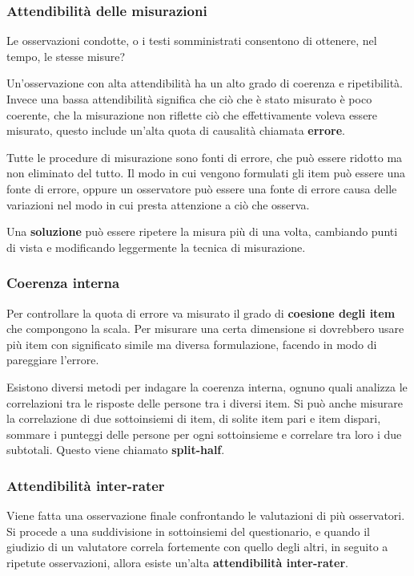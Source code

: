 \documentclass{subfiles}
\begin{document}
    \subsubsection*{Attendibilità delle misurazioni}
        Le osservazioni condotte, o i testi somministrati consentono di ottenere, nel tempo, le stesse 
        misure?

        Un'osservazione con alta attendibilità ha un alto grado di coerenza e ripetibilità. 
        Invece una bassa attendibilità significa che ciò che è stato misurato è poco coerente, che 
        la misurazione non riflette ciò che effettivamente voleva essere misurato, questo include 
        un'alta quota di causalità chiamata \textbf{errore}.

        Tutte le procedure di misurazione sono fonti di errore, che può essere ridotto ma non 
        eliminato del tutto.
        Il modo in cui vengono formulati gli item può essere una fonte di errore, oppure un 
        osservatore può essere una fonte di errore causa delle variazioni nel modo in cui presta 
        attenzione a ciò che osserva. 

        Una \textbf{soluzione} può essere ripetere la misura più di una volta, cambiando punti 
        di vista e modificando leggermente la tecnica di misurazione. 

    \subsubsection*{Coerenza interna}
        Per controllare la quota di errore va misurato il grado di \textbf{coesione degli item} che 
        compongono la scala.
        Per misurare una certa dimensione si dovrebbero usare più item con significato simile ma 
        diversa formulazione, facendo in modo di pareggiare l'errore.

        Esistono diversi metodi per indagare la coerenza interna, ognuno quali analizza le correlazioni 
        tra le risposte delle persone tra i diversi item.
        Si può anche misurare la correlazione di due sottoinsiemi di item, di solite item pari e item 
        dispari, sommare i punteggi delle persone per ogni sottoinsieme e correlare tra loro i due 
        subtotali. Questo viene chiamato \textbf{split-half}.

    \subsubsection*{Attendibilità inter-rater}
        Viene fatta una osservazione finale confrontando le valutazioni di più osservatori. 
        Si procede a una suddivisione in sottoinsiemi del questionario, e quando il giudizio di un 
        valutatore correla fortemente con quello degli altri, in seguito a ripetute osservazioni, 
        allora esiste un'alta \textbf{attendibilità inter-rater}.
\end{document}
